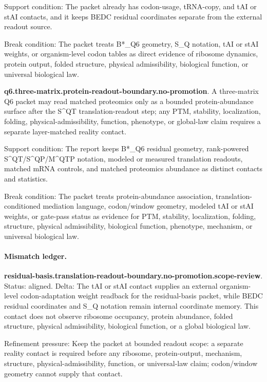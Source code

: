 Support condition: The packet already has codon-usage, tRNA-copy, and tAI or stAI contacts, and it keeps BEDC residual coordinates separate from the external readout source.

Break condition: The packet treats B*\_Q6 geometry, S\_Q notation, tAI or stAI weights, or organism-level codon tables as direct evidence of ribosome dynamics, protein output, folded structure, physical admissibility, biological function, or universal biological law.

\textbf{q6.three-matrix.protein-readout-boundary.no-promotion}. A three-matrix Q6 packet may read matched proteomics only as a bounded protein-abundance surface after the S\textasciicircum{}QT translation-readout step; any PTM, stability, localization, folding, physical-admissibility, function, phenotype, or global-law claim requires a separate layer-matched reality contact.

Support condition: The report keeps B*\_Q6 residual geometry, rank-powered S\textasciicircum{}QT/S\textasciicircum{}QP/M\textasciicircum{}QTP notation, modeled or measured translation readouts, matched mRNA controls, and matched proteomics abundance as distinct contacts and statistics.

Break condition: The packet treats protein-abundance association, translation-conditioned mediation language, codon/window geometry, modeled tAI or stAI weights, or gate-pass status as evidence for PTM, stability, localization, folding, structure, physical admissibility, biological function, phenotype, mechanism, or universal biological law.

\paragraph{Mismatch ledger.}
\textbf{residual-basis.translation-readout-boundary.no-promotion.scope-review}. Status: aligned. Delta: The tAI or stAI contact supplies an external organism-level codon-adaptation weight readback for the residual-basis packet, while BEDC residual coordinates and S\_Q notation remain internal coordinate memory. This contact does not observe ribosome occupancy, protein abundance, folded structure, physical admissibility, biological function, or a global biological law.

Refinement pressure: Keep the packet at bounded readout scope: a separate reality contact is required before any ribosome, protein-output, mechanism, structure, physical-admissibility, function, or universal-law claim; codon/window geometry cannot supply that contact.


